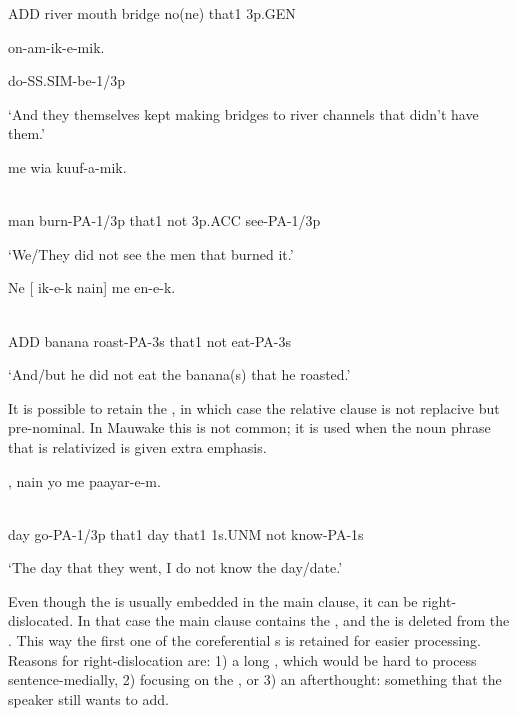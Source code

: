 ADD  river  mouth  bridge  no(ne)  that1  3p.GEN

on-am-ik-e-mik.

do-SS.SIM-be-1/3p

`And they themselves kept making bridges to river channels that didn't have them.' 

\ea%
\label{ex:x1545}
  me  wia  kuuf-a-mik. \\
      \\
\glt
\z

man  burn-PA-1/3p  that1  not  3p.ACC  see-PA-1/3p

`We/They did not see the men that burned it.'

\ea%
\label{ex:x1546}
\gll Ne  [  ik-e-k  nain]  me  en-e-k. \\
      \\
\glt
\z

ADD  banana  roast-PA-3s  that1  not  eat-PA-3s

`And/but he did not eat the banana(s) that he roasted.'

It is possible to retain the , in which case the relative clause is not replacive but pre-nominal. In Mauwake this is not common; it is used when the noun phrase that is relativized is given extra emphasis. 

\ea%
\label{ex:x1532}
,    nain  yo  me  paayar-e-m. \\
      \\
\glt
\z

day  go-PA-1/3p  that1  day  that1  1s.UNM  not  know-PA-1s

`The day that they went, I do not know the day/date.'

Even though the  is usually embedded in the main clause, it can be right-dislocated. In that case the main clause contains the , and the  is deleted from the . This way the first one of the coreferential s  is retained for easier processing. Reasons for right-dislocation are: 1) a long , which would be hard to process sentence-medially, 2) focusing on the , or 3) an afterthought: something that the speaker still wants to add.

